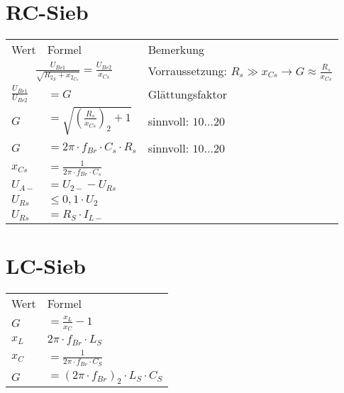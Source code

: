 \section{RC-Sieb}\label{sec:rc-sieb}
\renewcommand{\arraystretch}{0.9}
    \begin{table}[H]
        \begin{tabularx}{\columnwidth}{l l l}
            Wert & Formel & Bemerkung \\
            \multicolumn{2}{c}{$\frac{U_{Br1}}{\sqrt{R_{2_S}+x_{2_{Cs}}}}=\frac{U_{Br2}}{x_{Cs}}$} & Vorraussetzung: $R_s\gg x_{Cs}\to G\approx\frac{R_s}{x_{Cs}}$ \\
            $\frac{U_{Br1}}{U_{Br2}}$ & $=G$ & Glättungsfaktor \\
            $G$ & $=\sqrt{(\frac{R_s}{x_{Cs}})_2+1}$ & sinnvoll: $10\dots 20$ \\
            $G$ & $=2\pi\cdot f_{Br}\cdot C_s\cdot  R_s$ & sinnvoll: $10\dots 20$ \\
            $x_{Cs}$ & $=\frac{1}{2\pi\cdot f_{Br}\cdot C_s}$ & \\
            $U_{A-}$ & $=U_{2-}-U_{Rs}$ & \\
            $U_{Rs}$ & $\leq 0,1\cdot U_2$ & \\
            $U_{Rs}$ & $=R_S\cdot I_{L-}$ & \\
        \end{tabularx}
    \end{table}
      

\section{LC-Sieb}\label{sec:lc-sieb}
    \begin{minipage}{0.65\columnwidth}
        \begin{table}[H]
            \begin{tabularx}{\columnwidth}{l l}
                Wert & Formel \\
                $G$ & $=\frac{x_L}{x_C}-1$ \\
                $x_L$ & $2\pi\cdot f_{Br}\cdot L_S$ \\
                $x_C$ & $=\frac{1}{2\pi\cdot f_{Br}\cdot C_S}$ \\
                $G$ & $=(2\pi\cdot f_{Br})_2\cdot L_S\cdot C_S$ \\
            \end{tabularx}
        \end{table}
    \end{minipage}
    \begin{minipage}{0.35\columnwidth}
    \end{minipage}


